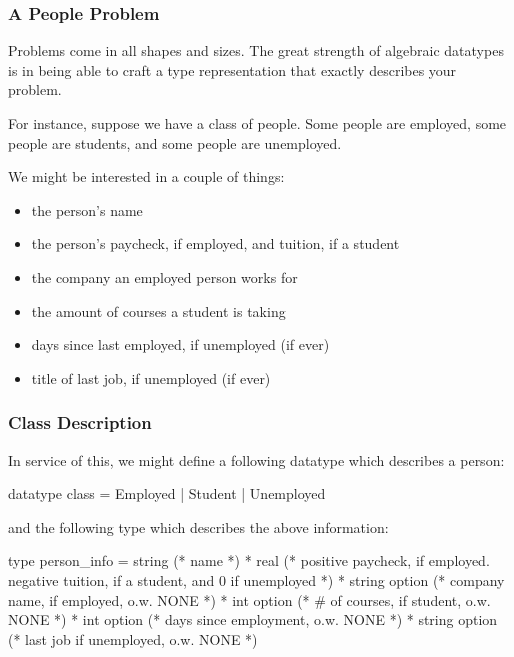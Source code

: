 \documentclass[aspectratio=169, handout]{beamer}
\begin{document}

\begin{frame}[fragile]
  \frametitle{A People Problem}

  Problems come in all shapes and sizes. The great strength of algebraic datatypes
  is in being able to craft a type representation that exactly describes your problem.

  \pause
  \vspace{\fill}

  For instance, suppose we have a class of people. Some people are employed, some
  people are students, and some people are unemployed.

  \pause
  \vspace{\fill}

  We might be interested in a couple of things:
  \begin{itemize}
    \item the person's name
    \item the person's paycheck, if employed, and tuition, if a student
    \item the company an employed person works for
    \item the amount of courses a student is taking
    \item days since last employed, if unemployed (if ever)
    \item title of last job, if unemployed (if ever)
  \end{itemize}
\end{frame}

\begin{frame}[fragile]
  \frametitle{Class Description}

  In service of this, we might define a following datatype which describes a person:
  \begin{codeblock}
    datatype class = Employed | Student | Unemployed
  \end{codeblock}

  \pause
  and the following type which describes the above information:
  \begin{codeblock}
    type person_info =
      string (* name *)
      * real (* positive paycheck, if employed. negative
                tuition, if a student, and 0 if unemployed *)
      * string option (* company name, if employed, o.w. NONE *)
      * int option    (* # of courses, if student, o.w. NONE *)
      * int option    (* days since employment, o.w. NONE *)
      * string option (* last job if unemployed, o.w. NONE *)
  \end{codeblock}
\end{frame}
\end{document}
